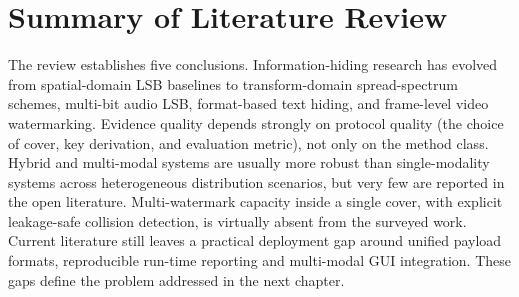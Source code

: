 \section{Summary of Literature Review}

The review establishes five conclusions. Information-hiding research has evolved from spatial-domain LSB baselines to transform-domain spread-spectrum schemes, multi-bit audio LSB, format-based text hiding, and frame-level video watermarking. Evidence quality depends strongly on protocol quality (the choice of cover, key derivation, and evaluation metric), not only on the method class. Hybrid and multi-modal systems are usually more robust than single-modality systems across heterogeneous distribution scenarios, but very few are reported in the open literature. Multi-watermark capacity inside a single cover, with explicit leakage-safe collision detection, is virtually absent from the surveyed work. Current literature still leaves a practical deployment gap around unified payload formats, reproducible run-time reporting and multi-modal GUI integration. These gaps define the problem addressed in the next chapter.
